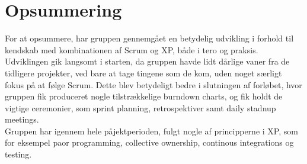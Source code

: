 \section{Opsummering}
For at opsummere, har gruppen gennemgået en betydelig udvikling i forhold til kendskab med kombinationen af
Scrum og XP, både i tero og praksis. Udviklingen gik langsomt i starten, da gruppen havde lidt dårlige vaner fra de
tidligere projekter, ved bare at tage tingene som de kom, uden noget særligt fokus på at følge Scrum. Dette blev betydeligt
bedre i slutningen af forløbet, hvor gruppen fik produceret nogle tilstrækkelige burndown charts, og fik holdt de vigtige ceremonier,
som sprint planning, retrospektiver samt daily stadnup meetings. \\

Gruppen har igennem hele påjektperioden, fulgt nogle af principperne i XP, som for eksempel paor programming, collective ownership, continous integrations
og testing.